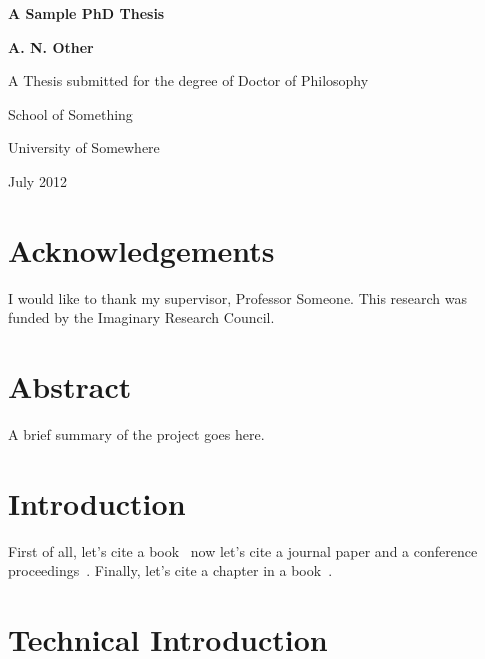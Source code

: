 \documentclass[oneside,12pt]{scrbook}
\theoremstyle{break}
\begin{document}
\begin{titlepage}
\centering
\vspace*{1in}
\begin{Large}\bfseries
A Sample PhD Thesis\par
\end{Large}
\vspace{1.5in}
\begin{large}\bfseries
A. N. Other\par
\end{large}
\vfill
A Thesis submitted for the degree of Doctor of Philosophy
\par
\vspace{0.5in}
School of Something
\par
University of Somewhere
\par
\vspace{0.5in}
July 2012
\par
\end{titlepage}

\doublespacing

\frontmatter
\tableofcontents
\listoffigures
\listoftables
\lstlistoflistings

\chapter{Acknowledgements}

I would like to thank my supervisor, Professor Someone. This
research was funded by the Imaginary Research Council.

\chapter{Abstract}

A brief summary of the project goes here.

\mainmatter

\chapter{Introduction}
\label{ch:intro}

First of all, let's cite a book~\parencite{wainwright93} now let's cite a journal paper and a conference proceedings~\parencite{cawley96,talbot97}. Finally, let's cite a chapter in a book~\parencite[Chapter 9]{goossens97}. 


\chapter{Technical Introduction}
\label{ch:techintro}
\end{document}
